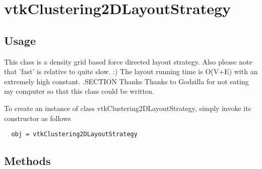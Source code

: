 \section{vtkClustering2DLayoutStrategy}

\subsection{Usage}

 This class is a density grid based force directed layout strategy.
 Also please note that 'fast' is relative to quite slow. :)
 The layout running time is O(V+E) with an extremely high constant.
 .SECTION Thanks
 Thanks to Godzilla for not eating my computer so that this class
 could be written.

To create an instance of class vtkClustering2DLayoutStrategy, simply
invoke its constructor as follows
\begin{verbatim}
  obj = vtkClustering2DLayoutStrategy
\end{verbatim}
\subsection{Methods}

